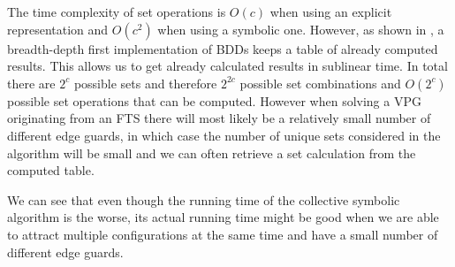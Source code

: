 The time complexity of set operations is $O(c)$ when using an explicit representation and $O(c^2)$ when using a symbolic one. However, as shown in \cite{BDD_running_time}, a breadth-depth first implementation of BDDs keeps a table of already computed results. This allows us to get already calculated results in sublinear time. In total there are $2^c$ possible sets and therefore $2^{2c}$ possible set combinations and $O(2^c)$ possible set operations that can be computed. However when solving a VPG originating from an FTS there will most likely be a relatively small number of different edge guards, in which case the number of unique sets considered in the algorithm will be small and we can often retrieve a set calculation from the computed table.

We can see that even though the running time of the collective symbolic algorithm is the worse, its actual running time might be good when we are able to attract multiple configurations at the same time and have a small number of different edge guards.